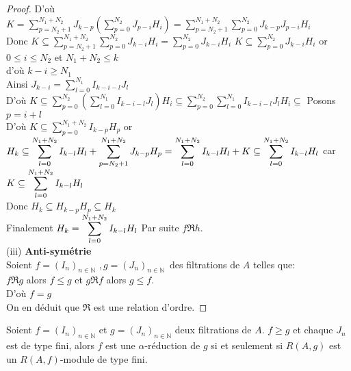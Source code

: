 \begin{proof}
	D'où $K=\displaystyle  \sum_{p=N_{2}+1}^{N_{1}+N_{2}}J_{k-p}(\displaystyle  \sum_{p=0}^{N_{2}}J_{p-i}H_{i})=\displaystyle  \sum_{p=N_{2}+1}^{N_{1}+N_{2}}\displaystyle  \sum_{p=0}^{N_{2}}J_{k-p}J_{p-i}H_{i}$ \\
	Donc $K\subseteq\displaystyle  \sum_{p=N_{2}+1}^{N_{1}+N_{2}}\displaystyle  \sum_{p=0}^{N_{2}}J_{k-i}H_{i}=\displaystyle  \sum_{p=0}^{N_{2}}J_{k-i}H_{i}$
	$K\subseteq \displaystyle  \sum_{p=0}^{N_{2}}J_{k-i}H_{i}$
	or $0\leq i\leq N_{2}$ et $N_{1}+N_{2}\leq k$ \\
	d'où $k-i\geq N_{1}$ \\
	Ainsi $J_{k-i}=\displaystyle  \sum_{l=0}^{N_{1}}I_{k-i-l}J_{l}$ \\
	D'où $K\subseteq\displaystyle  \sum_{p=0}^{N_{2}}(\displaystyle  \sum_{l=0}^{N_{1}}I_{k-i-l}J_{l})H_{i}\subseteq\displaystyle  \sum_{p=0}^{N_{2}}\displaystyle  \sum_{l=0}^{N_{1}}I_{k-i-l}J_{l}H_{i}\subseteq $
	Posons $p=i+l$ \\
	D'où $K\subseteq \displaystyle  \sum_{p=0}^{N_{1}+N_{2}}I_{k-p}H_{p}$
	or $H_{k}\subseteq
	\displaystyle  \sum_{l=0}^{N_{1}+N_{2}}I_{k-l}H_{l}+\displaystyle  \sum_{p=N_{2}+1}^{N_{1}+N_{2}}J_{k-p}H_{p}=\displaystyle  \sum_{l=0}^{N_{1}+N_{2}}I_{k-l}H_{l}+K\subseteq \displaystyle  \displaystyle  \sum_{l=0}^{N_{1}+N_{2}}I_{k-l}H_{l}$ car $K\subseteq \displaystyle  \displaystyle  \sum_{l=0}^{N_{1}+N_{2}}I_{k-l}H_{l}$ \\
	Donc $H_{k}\subseteq H_{k-p}H_{p}\subseteq H_{k}$ \\
	Finalement $H_{k}=\displaystyle  \displaystyle  \sum_{l=0}^{N_{1}+N_{2}}I_{k-l}H_{l}$
	Par suite $f \Re h$. \\
	
	(iii) \textbf{Anti-symétrie} \\
	Soient $f=(I_{n})_{n\in \mathbb{N}}$ $,g=(J_{n})_{n\in \mathbb{N} }$\ des filtrations de $A$ telles que: \\
	$f \Re g$ alors $f\leq g$ et $g \Re f$ alors $g\leq f.$ \\
	D'où $f=g$ \\
	On en déduit que $\Re$ est une relation d'ordre. 
\end{proof}
\begin{maproposition}
	Soient $f=(I_n)_{n \in \mathbb{N}}$ et $g=(J_n)_{n \in \mathbb{N}}$ deux filtrations de $A$. $f \geq g$ et chaque $J_n$ est de type fini, alors $f$ est une $\alpha$-réduction de $g$ si et seulement si $R(A,g)$ est un $R(A,f)$-module de type fini.
\end{maproposition}
